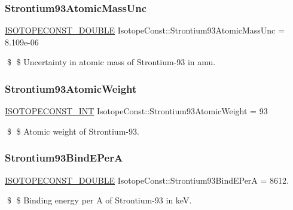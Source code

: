 \subsubsection{\texorpdfstring{Strontium93\+Atomic\+Mass\+Unc}{Strontium93AtomicMassUnc}}
{\footnotesize\ttfamily \mbox{\hyperlink{group___isotope_const-_macros_ga8f45a7272ce02c0b4c65c44636ed719a}{I\+S\+O\+T\+O\+P\+E\+C\+O\+N\+S\+T\+\_\+\+D\+O\+U\+B\+LE}} Isotope\+Const\+::\+Strontium93\+Atomic\+Mass\+Unc = 8.\+109e-\/06}

\$ \$ Uncertainty in atomic mass of Strontium-\/93 in amu. \mbox{\label{group___isotope_const-_strontium-_sr93_gaf01810801a3b883bf9737530e2942019}} 
\subsubsection{\texorpdfstring{Strontium93\+Atomic\+Weight}{Strontium93AtomicWeight}}
{\footnotesize\ttfamily \mbox{\hyperlink{group___isotope_const-_macros_ga5f18360b3e99483a35c32d789e62621c}{I\+S\+O\+T\+O\+P\+E\+C\+O\+N\+S\+T\+\_\+\+I\+NT}} Isotope\+Const\+::\+Strontium93\+Atomic\+Weight = 93}

\$ \$ Atomic weight of Strontium-\/93. \mbox{\label{group___isotope_const-_strontium-_sr93_gaf1d3ab202d260d8c4b295dec67e3bdf9}} 
\subsubsection{\texorpdfstring{Strontium93\+Bind\+E\+PerA}{Strontium93BindEPerA}}
{\footnotesize\ttfamily \mbox{\hyperlink{group___isotope_const-_macros_ga8f45a7272ce02c0b4c65c44636ed719a}{I\+S\+O\+T\+O\+P\+E\+C\+O\+N\+S\+T\+\_\+\+D\+O\+U\+B\+LE}} Isotope\+Const\+::\+Strontium93\+Bind\+E\+PerA = 8612.}

\$ \$ Binding energy per A of Strontium-\/93 in keV. \mbox{\label{group___isotope_const-_strontium-_sr93_ga4fb2f28e18ed98464efb3e2a3ed15433}} 
